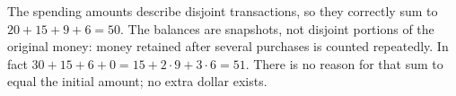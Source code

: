 The spending amounts describe disjoint transactions, so they correctly sum to $20+15+9+6=50$. The balances are snapshots, not disjoint portions of the original money: money retained after several purchases is counted repeatedly. In fact $30+15+6+0=15+2\cdot9+3\cdot6=51$. There is no reason for that sum to equal the initial amount; no extra dollar exists.
